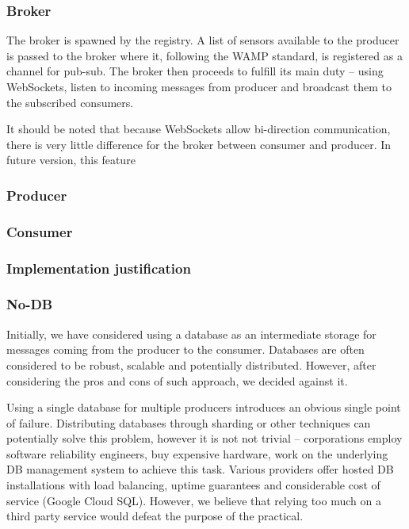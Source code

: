 \subsubsection{Broker}\label{broker-1}

The broker is spawned by the registry. A list of sensors available to
the producer is passed to the broker where it, following the WAMP
standard, is registered as a channel for pub-sub. The broker then
proceeds to fulfill its main duty -- using WebSockets, listen to
incoming messages from producer and broadcast them to the subscribed
consumers.

It should be noted that because WebSockets allow bi-direction
communication, there is very little difference for the broker between
consumer and producer. In future version, this feature

\subsubsection{Producer}\label{producer-1}

\subsubsection{Consumer}\label{consumer-1}

\subsubsection{Implementation
justification}\label{implementation-justification}

\subsubsection{No-DB}\label{no-db}

Initially, we have considered using a database as an intermediate
storage for messages coming from the producer to the consumer. Databases
are often considered to be robust, scalable and potentially distributed.
However, after considering the pros and cons of such approach, we
decided against it.

Using a single database for multiple producers introduces an obvious
single point of failure. Distributing databases through sharding or
other techniques can potentially solve this problem, however it is not
not trivial -- corporations employ software reliability engineers, buy
expensive hardware, work on the underlying DB management system to
achieve this task. Various providers offer hosted DB installations with
load balancing, uptime guarantees and considerable cost of service
(Google Cloud SQL). However, we believe that relying too much on a third
party service would defeat the purpose of the practical.

